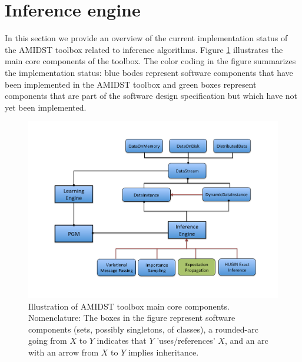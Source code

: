 \section{Inference engine} \label{sec:InferenceEngine}

In this section we provide an overview of the current implementation status of the AMIDST toolbox related to inference algorithms. Figure \ref{Figure:InferenceEngine} illustrates the main core components of the toolbox. The color coding in the figure summarizes the implementation status: blue bodes represent software components that have been implemented in the AMIDST toolbox and green boxes represent components that are part of the software design specification but which have not yet been implemented.

\vspace{-0.1in}

\begin{figure}[ht!]
\begin{center}
\includegraphics[width=\linewidth]{./figures/InferenceEngine}
\vspace{-0.5in}
\caption{\label{Figure:InferenceEngine} Illustration of AMIDST toolbox main core components. Nomenclature: The boxes in the
      figure represent software components (sets, possibly singletons, of classes), a rounded-arc going from $X$ to $Y$ indicates that $Y$ 'uses/references' $X$, and an arc with an arrow from $X$ to $Y$ implies inheritance.}
\end{center}
\end{figure}

